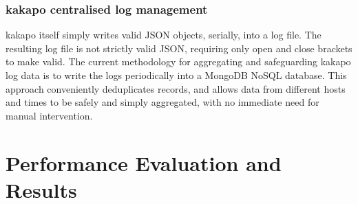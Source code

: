 \subsubsection{kakapo centralised log management}
kakapo itself simply writes valid JSON objects, serially, into a log file.
The resulting log file is not strictly valid JSON, requiring only open and close brackets to make valid.
The current methodology for aggregating and safeguarding kakapo log data is to write the logs periodically into a MongoDB NoSQL database.
This approach conveniently deduplicates records, and allows data from different hosts and times to be safely and simply aggregated, with no immediate need for manual intervention.

\section{Performance Evaluation and Results}


